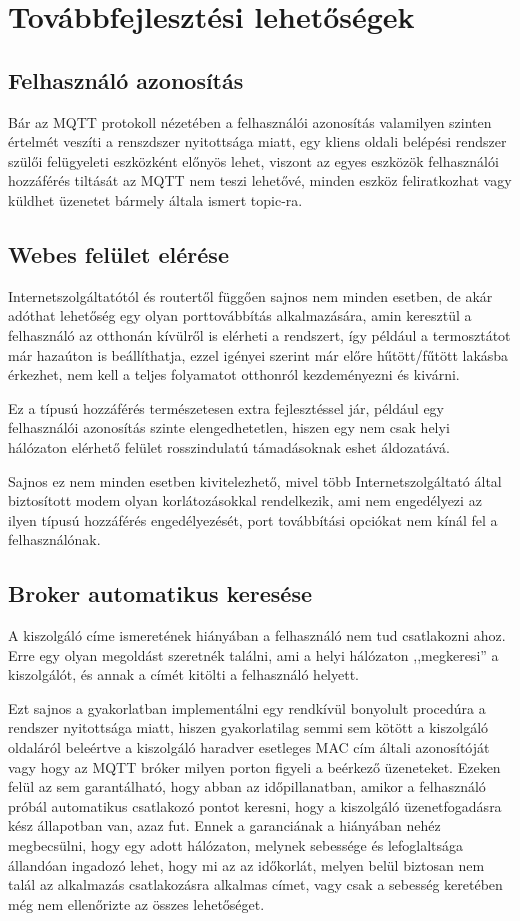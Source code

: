 \documentclass[
]{thesis-ekf}
\theoremstyle{definition}
\theoremstyle{remark}
\begin{document}
\chapter{Továbbfejlesztési lehetőségek}
\section{Felhasználó azonosítás}
Bár az MQTT protokoll nézetében a felhasználói azonosítás valamilyen szinten értelmét veszíti
a renszdszer nyitottsága miatt, egy kliens oldali belépési rendszer szülői felügyeleti
eszközként előnyös lehet, viszont az egyes eszközök felhasználói hozzáférés tiltását az MQTT
nem teszi lehetővé, minden eszköz feliratkozhat vagy küldhet üzenetet bármely általa ismert
topic-ra.

\section{Webes felület elérése}
Internetszolgáltatótól és routertől függően sajnos nem minden esetben, de akár adóthat lehetőség egy olyan
porttovábbítás alkalmazására, amin keresztül a felhasználó az otthonán kívülről is elérheti a rendszert,
így például a termosztátot már hazaúton is beállíthatja, ezzel igényei szerint már előre hűtött/fűtött lakásba
érkezhet, nem kell a teljes folyamatot otthonról kezdeményezni és kivárni.

Ez a típusú hozzáférés természetesen extra fejlesztéssel jár, például egy felhasználói azonosítás
szinte elengedhetetlen, hiszen egy nem csak helyi hálózaton elérhető felület rosszindulatú támadásoknak
eshet áldozatává.

Sajnos ez nem minden esetben kivitelezhető, mivel több Internetszolgáltató által biztosított modem
olyan korlátozásokkal rendelkezik, ami nem engedélyezi az ilyen típusú hozzáférés engedélyezését,
port továbbítási opciókat nem kínál fel a felhasználónak.

\section{Broker automatikus keresése}
A kiszolgáló címe ismeretének hiányában a felhasználó nem tud csatlakozni ahoz. Erre egy olyan megoldást
szeretnék találni, ami a helyi hálózaton ,,megkeresi'' a kiszolgálót, és annak a címét kitölti a felhasználó helyett.

Ezt sajnos a gyakorlatban implementálni egy rendkívül bonyolult procedúra a rendszer nyitottsága miatt, hiszen
gyakorlatilag semmi sem kötött a kiszolgáló oldaláról beleértve a kiszolgáló haradver esetleges MAC cím általi
azonosítóját vagy hogy az MQTT bróker milyen porton figyeli a beérkező üzeneteket. Ezeken felül az sem garantálható,
hogy abban az időpillanatban, amikor a felhasználó próbál automatikus csatlakozó pontot keresni, hogy a kiszolgáló
üzenetfogadásra kész állapotban van, azaz fut. Ennek a garanciának a hiányában nehéz megbecsülni, hogy
egy adott hálózaton, melynek sebessége és lefoglaltsága állandóan ingadozó lehet, hogy mi az az időkorlát,
melyen belül biztosan nem talál az alkalmazás csatlakozásra alkalmas címet, vagy csak a sebesség keretében
még nem ellenőrizte az összes lehetőséget.
\end{document}
